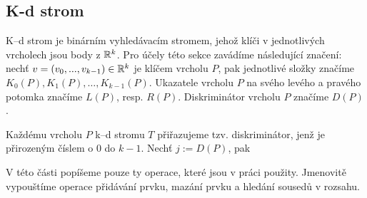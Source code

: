 \subsection{K-d strom}

K--d strom je binárním vyhledávacím stromem, jehož klíči v jednotlivých vrcholech jsou body z $\mathbb{R}{}^k$. Pro účely této sekce zavádíme následující značení: nechť $v = (v_0, ..., v_{k - 1})  \in \mathbb{R}^k$ je klíčem vrcholu $P$, pak jednotlivé složky značíme $K_0(P), K_1(P), \ldots, K_{k - 1}(P)$. Ukazatele vrcholu $P$ na svého levého a pravého potomka značíme $L(P)$, resp. $R(P)$. Diskriminátor vrcholu $P$ značíme $D(P)$.

Každému vrcholu $P$ k--d stromu $T$ přiřazujeme tzv. diskriminátor, jenž je přirozeným číslem o $0$ do $k - 1$. Nechť $j := D(P)$, pak 

V této části popíšeme pouze ty operace, které jsou v práci použity. Jmenovitě vypouštíme operace přidávání prvku, mazání prvku a hledání sousedů v rozsahu.

